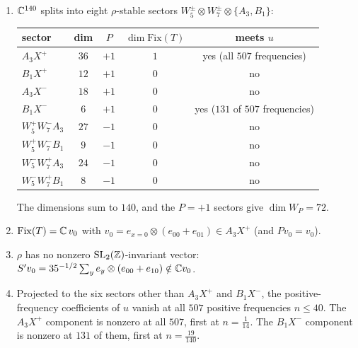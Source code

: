 \begin{proposition}\label{prop:sectors9}
\begin{enumerate}[label=(\roman*)]
\item $\mathbb{C}^{140}$ splits into eight $\rho$-stable sectors $W_5^\pm\otimes W_7^\pm\otimes\{A_3,B_1\}$:
\begin{center}\small
\begin{tabular}{lcccc}\toprule
sector & dim & $P$ & $\dim\mathrm{Fix}(T)$ & meets $u$\\\midrule
$A_3X^+$ & $36$ & $+1$ & $1$ & yes (all $507$ frequencies)\\
$B_1X^+$ & $12$ & $+1$ & $0$ & no\\
$A_3X^-$ & $18$ & $+1$ & $0$ & no\\
$B_1X^-$ & $6$ & $+1$ & $0$ & yes ($131$ of $507$ frequencies)\\
$W_5^+W_7^-A_3$ & $27$ & $-1$ & $0$ & no\\
$W_5^+W_7^-B_1$ & $9$ & $-1$ & $0$ & no\\
$W_5^-W_7^+A_3$ & $24$ & $-1$ & $0$ & no\\
$W_5^-W_7^+B_1$ & $8$ & $-1$ & $0$ & no\\\bottomrule
\end{tabular}
\end{center}
The dimensions sum to $140$, and the $P=+1$ sectors give $\dim W_P=72$.
\item $\mathrm{Fix}(T)=\mathbb{C}\,v_0$ with $v_0=e_{x=0}\otimes(e_{00}+e_{01})\in A_3X^+$ (and $Pv_0=v_0$).
\item $\rho$ has no nonzero $\mathrm{SL}_2(\mathbb{Z})$-invariant vector: $S'v_0=35^{-1/2}\sum_ye_y\otimes(e_{00}+e_{10})\notin\mathbb{C} v_0$.
\item Projected to the six sectors other than $A_3X^+$ and $B_1X^-$, the positive-frequency coefficients of $u$ vanish at all $507$ positive frequencies $n\le40$. The $A_3X^+$ component is nonzero at all $507$, first at $n=\tfrac1{14}$. The $B_1X^-$ component is nonzero at $131$ of them, first at $n=\tfrac{19}{140}$.
\end{enumerate}
\end{proposition}

